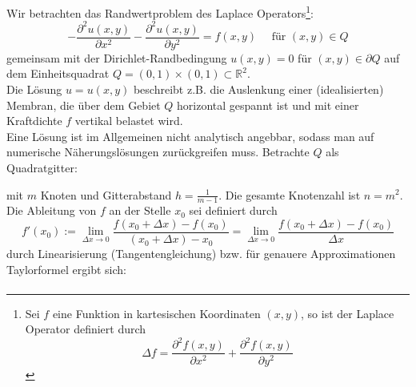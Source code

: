 \documentclass{article}
\begin{document}
    \begin{egbox}
        Wir betrachten das Randwertproblem des Laplace Operators\footnote{
            Sei $f$ eine Funktion in kartesischen Koordinaten $(x,y)$, so ist der Laplace Operator definiert durch 
            \[\Delta f = \dfrac{\partial^2 f(x,y)}{\partial x^2} + \dfrac{\partial^2 f(x,y)}{\partial y^2}\]
            }:
        \[-\dfrac{\partial^2 u(x,y)}{\partial x^2} - \dfrac{\partial^2 u(x,y)}{\partial y^2} = f(x,y) \quad 
        \text{ für } (x,y)\in Q\]
        gemeinsam mit der Dirichlet-Randbedingung $u(x,y)=0$ für $(x,y)\in \partial Q$ auf dem Einheitsquadrat 
        $Q=(0,1)\times(0,1)\subset\mathbb{R}^2$. \\
        Die Lösung $u=u(x,y)$ beschreibt z.B. die Auslenkung einer (idealisierten) Membran, die über dem Gebiet $Q$ 
        horizontal gespannt ist und mit einer Kraftdichte $f$ vertikal belastet wird. \\
        Eine Lösung ist im Allgemeinen nicht analytisch angebbar, sodass man auf numerische Näherungslösungen 
        zurückgreifen muss.
        Betrachte $Q$ als Quadratgitter: 
        \begin{center}
        \end{center}
        mit $m$ Knoten und Gitterabstand $h=\tfrac{1}{m-1}$. Die gesamte Knotenzahl ist $n=m^2$. \\
        Die Ableitung von $f$ an der Stelle $x_0$ sei definiert durch
        \[f'(x_0) := 
        \lim_{\Delta x \rightarrow 0} \dfrac{f(x_0+\Delta x)-f(x_0)}{(x_0+\Delta x) - x_0} 
        = \lim_{\Delta x \rightarrow 0} \dfrac{f(x_0+\Delta x)-f(x_0)}{\Delta x} \]
        durch Linearisierung (Tangentengleichung) bzw. für genauere Approximationen Taylorformel ergibt sich:
        \begin{align*}

\end{align*}
\end{egbox}
\end{document}
